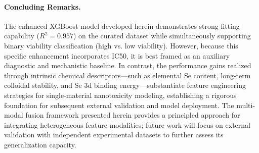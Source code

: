\paragraph{Concluding Remarks.}
The enhanced XGBoost model developed herein demonstrates strong fitting capability ($R^2 = 0.957$) on the curated dataset while simultaneously supporting binary viability classification (high vs. low viability). However, because this specific enhancement incorporates IC50, it is best framed as an auxiliary diagnostic and mechanistic baseline. In contrast, the performance gains realized through intrinsic chemical descriptors—such as elemental Se content, long-term colloidal stability, and Se 3d binding energy—substantiate feature engineering strategies for single-material nanotoxicity modeling, establishing a rigorous foundation for subsequent external validation and model deployment. The multi-modal fusion framework presented herein provides a principled approach for integrating heterogeneous feature modalities; future work will focus on external validation with independent experimental datasets to further assess its generalization capacity.
